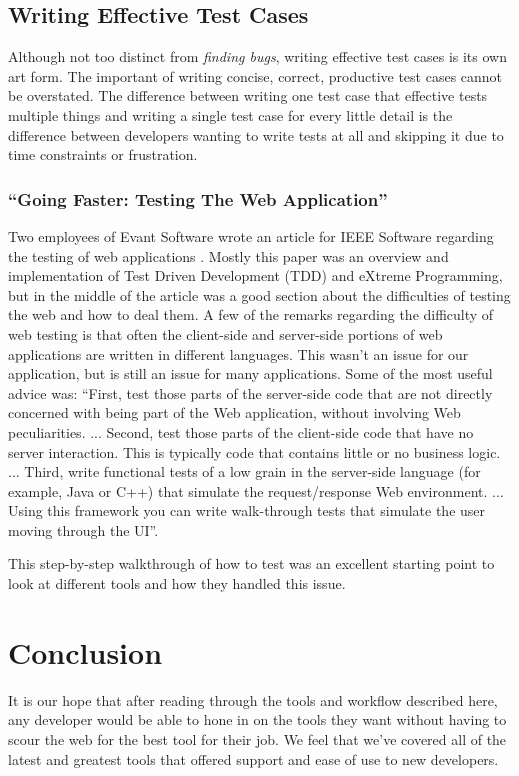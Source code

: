 \documentclass[12pt]{ucthesis}
\begin{document}
\section{Writing Effective Test Cases}
Although not too distinct from \emph{finding bugs}, writing effective test cases is its own art form. The important of writing concise, correct, productive test cases cannot be overstated. The difference between writing one test case that effective tests multiple things and writing a single test case for every little detail is the difference between developers wanting to write tests at all and skipping it due to time constraints or frustration.

\subsection{``Going Faster: Testing The Web Application''}
Two employees of Evant Software wrote an article for IEEE Software regarding the testing of web applications \cite{GoingFaster}. Mostly this paper was an overview and implementation of Test Driven Development (TDD) and eXtreme Programming, but in the middle of the article was a good section about the difficulties of testing the web and how to deal them. A few of the remarks regarding the difficulty of web testing is that often the client-side and server-side portions of web applications are written in different languages. This wasn't an issue for our application, but is still an issue for many applications. Some of the most useful advice was: ``First, test those parts of the server-side code that are not directly concerned with being part of the Web application, without involving Web peculiarities. ... Second, test those parts of the client-side code that have no server interaction. This is typically code that contains little or no business logic. ... Third, write functional tests of a low grain in the server-side language (for example, Java or C++) that simulate the request/response Web environment. ... Using this framework you can write walk-through tests that simulate the user moving through the UI''.

This step-by-step walkthrough of how to test was an excellent starting point to look at different tools and how they handled this issue.

\chapter{Conclusion}
It is our hope that after reading through the tools and workflow described here, any developer would be able to hone in on the tools they want without having to scour the web for the best tool for their job. We feel that we've covered all of the latest and greatest tools that offered support and ease of use to new developers.
\end{document}
